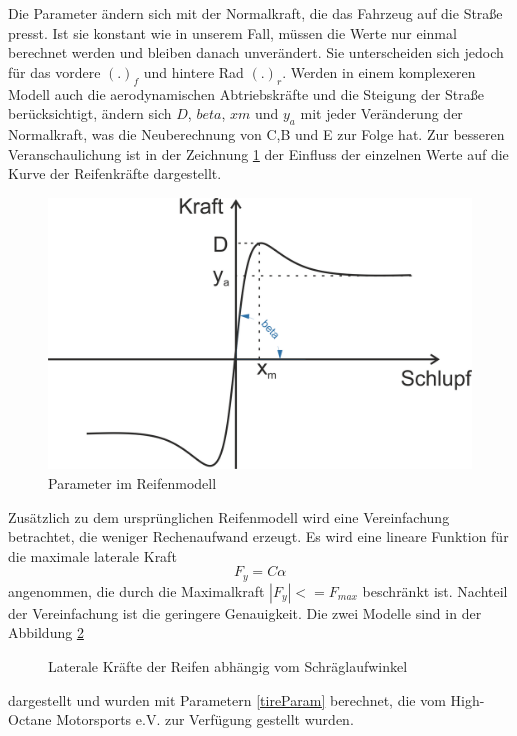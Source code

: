 \documentclass{like}
\begin{document}
Die Parameter ändern sich mit der Normalkraft, die das Fahrzeug auf die Straße presst. Ist sie konstant wie in unserem Fall, müssen die Werte nur einmal berechnet werden und bleiben danach unverändert. Sie unterscheiden sich jedoch für das vordere $(.)_f$ und hintere Rad $(.)_r$. Werden in einem komplexeren Modell auch die aerodynamischen Abtriebskräfte und die Steigung der Straße berücksichtigt, ändern sich $D$, $beta$, $xm$ und $y_a$ mit jeder Veränderung der Normalkraft, was die Neuberechnung von C,B und E zur Folge hat. Zur besseren Veranschaulichung ist in der Zeichnung \ref{fig:tireModelParameter} der Einfluss der einzelnen Werte auf die Kurve der Reifenkräfte dargestellt. 

\begin{figure}[ht!]
	\centering
	\includegraphics[width=350pt]{Abbildungen/tireModel.png}
	\caption{Parameter im Reifenmodell}
	\label{fig:tireModelParameter}
\end{figure}
 
Zusätzlich zu dem ursprünglichen Reifenmodell wird eine Vereinfachung betrachtet, die weniger Rechenaufwand erzeugt. Es wird eine lineare Funktion für die maximale laterale Kraft
\begin{equation}
F_y = C \alpha 
\end{equation}
angenommen, die durch die Maximalkraft $|F_y| <= F_{max} $ beschränkt ist.
Nachteil der Vereinfachung ist die geringere Genauigkeit. 
Die zwei Modelle sind in der Abbildung \ref{fig:pacejka}
\begin{figure}[ht!]
	\centering
	 
	\caption{Laterale Kräfte der Reifen abhängig vom Schräglaufwinkel}
	\label{fig:pacejka}
\end{figure}

dargestellt und wurden mit Parametern \ref{tireParam} berechnet, die vom High-Octane Motorsports e.V. zur Verfügung gestellt wurden.
\end{document}
